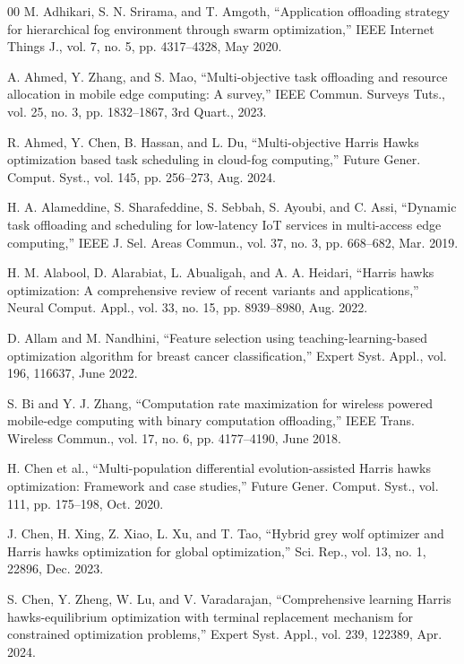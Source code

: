 \documentclass[conference]{IEEEtran}
\begin{document}
\begin{thebibliography}{00}
 M. Adhikari, S. N. Srirama, and T. Amgoth, ``Application offloading strategy for hierarchical fog environment through swarm optimization,'' IEEE Internet Things J., vol. 7, no. 5, pp. 4317--4328, May 2020.

 A. Ahmed, Y. Zhang, and S. Mao, ``Multi-objective task offloading and resource allocation in mobile edge computing: A survey,'' IEEE Commun. Surveys Tuts., vol. 25, no. 3, pp. 1832--1867, 3rd Quart., 2023.

 R. Ahmed, Y. Chen, B. Hassan, and L. Du, ``Multi-objective Harris Hawks optimization based task scheduling in cloud-fog computing,'' Future Gener. Comput. Syst., vol. 145, pp. 256--273, Aug. 2024.

 H. A. Alameddine, S. Sharafeddine, S. Sebbah, S. Ayoubi, and C. Assi, ``Dynamic task offloading and scheduling for low-latency IoT services in multi-access edge computing,'' IEEE J. Sel. Areas Commun., vol. 37, no. 3, pp. 668--682, Mar. 2019.

 H. M. Alabool, D. Alarabiat, L. Abualigah, and A. A. Heidari, ``Harris hawks optimization: A comprehensive review of recent variants and applications,'' Neural Comput. Appl., vol. 33, no. 15, pp. 8939--8980, Aug. 2022.

 D. Allam and M. Nandhini, ``Feature selection using teaching-learning-based optimization algorithm for breast cancer classification,'' Expert Syst. Appl., vol. 196, 116637, June 2022.

 S. Bi and Y. J. Zhang, ``Computation rate maximization for wireless powered mobile-edge computing with binary computation offloading,'' IEEE Trans. Wireless Commun., vol. 17, no. 6, pp. 4177--4190, June 2018.

 H. Chen et al., ``Multi-population differential evolution-assisted Harris hawks optimization: Framework and case studies,'' Future Gener. Comput. Syst., vol. 111, pp. 175--198, Oct. 2020.

 J. Chen, H. Xing, Z. Xiao, L. Xu, and T. Tao, ``Hybrid grey wolf optimizer and Harris hawks optimization for global optimization,'' Sci. Rep., vol. 13, no. 1, 22896, Dec. 2023.

 S. Chen, Y. Zheng, W. Lu, and V. Varadarajan, ``Comprehensive learning Harris hawks-equilibrium optimization with terminal replacement mechanism for constrained optimization problems,'' Expert Syst. Appl., vol. 239, 122389, Apr. 2024.


\end{thebibliography}
\end{document}
